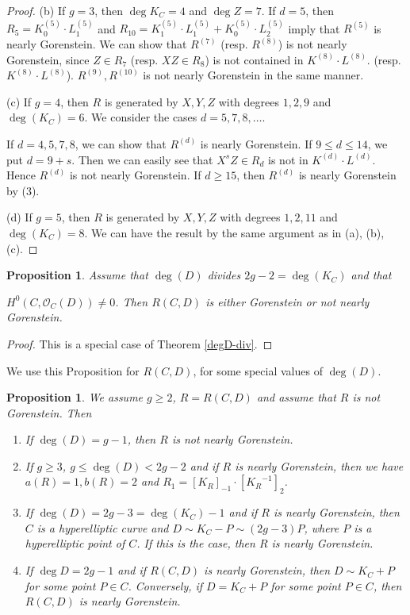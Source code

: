 \documentclass[12pt]{amsart}
\newtheorem{prop}[thm]{Proposition}
\theoremstyle{definition}
\theoremstyle{remark}
\numberwithin{equation}{section}
\newcommand{\KiR}{{K_R}^{-1}}
\newcommand{\cO}{\mathcal O}
\renewcommand{\:}{\colon}
\begin{document}
\begin{proof}
\par 
(b) If $g=3$, then $\deg K_C =4$ and $\deg Z =7$. If $d=5$, then 
$R_5 = K^{(5)}_0 \cdot  L^{(5)}_1$ and 
$R_{10} = K^{(5)}_1 \cdot  L^{(5)}_1 + 
K^{(5)}_0 \cdot  L^{(5)}_2$ imply that $R^{(5)}$ is nearly Gorenstein. 
We can show that $R^{(7)}$ (resp. $R^{(8)}$) is not nearly Gorenstein, 
since $Z \in R_7$ (resp. $XZ \in R_8$) is not contained in 
$K^{(8)} \cdot  L^{(8)}$. 
(resp. $K^{(8)} \cdot  L^{(8)}$). $R^{(9)}, R^{(10)}$ is not nearly Gorenstein in the same manner. 
\par  
(c) If $g=4$, then  $R$ is generated by $X,Y,Z$ with degrees $1,2, 9$ and $\deg (K_C) = 6$.  
We consider the cases $d = 5,7,8, \ldots$.
\par
If $d = 4,5,7,8$, we can show that $R^{(d)}$ is nearly Gorenstein. 
If $9\le d \le 14$, we put  
$d = 9+s$. 
Then we can easily see that $X^s Z\in R_d$ is not in  $K^{(d)} \cdot  L^{(d)}$.
Hence  $R^{(d)}$ is not nearly Gorenstein. If $d \ge 15$, then $R^{(d)}$ is nearly Gorenstein
by (3). 
\par 
(d) If $g=5$, then  $R$ is generated by $X,Y,Z$ with degrees $1,2, 11$ and $\deg (K_C) = 8$.
We can have the result by the same argument as in (a), (b), (c). 
\end{proof} 


\begin{prop}\label{degD|2g-2} 
Assume that $\deg (D)$ divides $2g-2 = \deg (K_C)$ and that\par
 $H^0(C, \cO_C(D)) \ne 0$. 
Then $R(C,D)$ is either Gorenstein or not nearly Gorenstein.  
\end{prop}
\begin{proof} 
This is a special case of Theorem \ref{degD-div}. 
\end{proof}

We use this Proposition for $R(C,D)$, for some special values of $\deg(D)$.

\begin{prop}\label{d=g-1} We assume $g\ge 2$, $R=R(C,D)$ and assume that 
$R$ is not Gorenstein. Then
\begin{enumerate}
\item If $\deg(D)= g-1$, then $R$ is not nearly Gorenstein. 
\item If $g\ge 3$, $g\le \deg(D) < 2g-2$ and if $R$ is nearly Gorenstein, then we have 
$a(R)=1, b(R)=2$ and $R_1 = [K_R]_{-1}\cdot [\KiR]_2$.   
\item If $\deg(D) = 2g-3 = \deg (K_C) -1$ and if $R$ is nearly Gorenstein, then 
$C$ is a hyperelliptic curve and $D \sim K_C - P \sim (2g-3)P$, 
where $P$ is a hyperelliptic point of $C$. 
If this is the case, then $R$ is nearly Gorenstein. 
\item If $\deg D = 2g-1$ and if $R(C,D)$ is nearly Gorenstein, then 
$D\sim K_C +P$ for some point $P\in C$. 
Conversely, if $D = K_C + P$ for some point $P\in C$, 
then $R(C,D)$ is nearly Gorenstein. 
\end{enumerate}
\end{prop}
\end{document}

